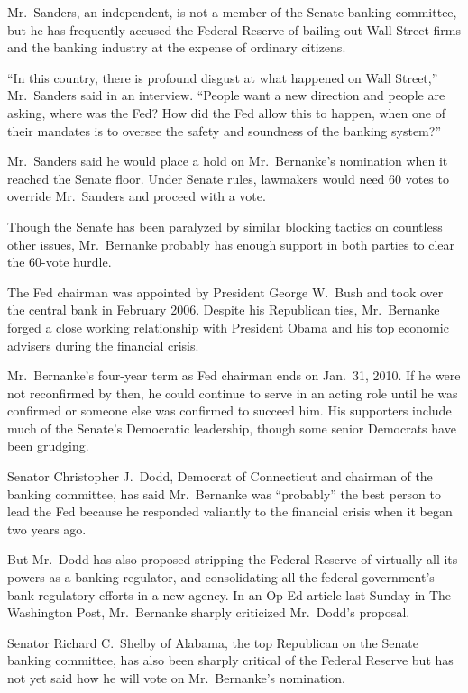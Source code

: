 ﻿\documentclass[12pt]{article}
\begin{document}
Mr.~Sanders, an independent, is not a member of the Senate banking committee, but he has frequently
accused the Federal Reserve of bailing out Wall Street firms and the banking industry at the expense
of ordinary citizens.

``In this country, there is profound disgust at what happened on Wall Street,'' Mr.~Sanders said in
an interview. ``People want a new direction and people are asking, where was the Fed? How did the
Fed allow this to happen, when one of their mandates is to oversee the safety and soundness of the
banking system?''

Mr.~Sanders said he would place a hold on Mr.~Bernanke's nomination when it reached the Senate
floor. Under Senate rules, lawmakers would need 60 votes to override Mr.~Sanders and proceed with a
vote.

Though the Senate has been paralyzed by similar blocking tactics on countless other issues,
Mr.~Bernanke probably has enough support in both parties to clear the 60-vote hurdle.

The Fed chairman was appointed by President George W.~Bush and took over the central bank in
February 2006. Despite his Republican ties, Mr.~Bernanke forged a close working relationship with
President Obama and his top economic advisers during the financial crisis.

Mr.~Bernanke's four-year term as Fed chairman ends on Jan.~31, 2010. If he were not reconfirmed by
then, he could continue to serve in an acting role until he was confirmed or someone else was
confirmed to succeed him. His supporters include much of the Senate's Democratic leadership, though
some senior Democrats have been grudging.

Senator Christopher J.~Dodd, Democrat of Connecticut and chairman of the banking committee, has said
Mr.~Bernanke was ``probably'' the best person to lead the Fed because he responded valiantly to the
financial crisis when it began two years ago.

But Mr.~Dodd has also proposed stripping the Federal Reserve of virtually all its powers as a
banking regulator, and consolidating all the federal government's bank regulatory efforts in a new
agency. In an Op-Ed article last Sunday in The Washington Post, Mr.~Bernanke sharply criticized
Mr.~Dodd's proposal.

Senator Richard C.~Shelby of Alabama, the top Republican on the Senate banking committee, has also
been sharply critical of the Federal Reserve but has not yet said how he will vote on Mr.~Bernanke's
nomination.
\end{document}
